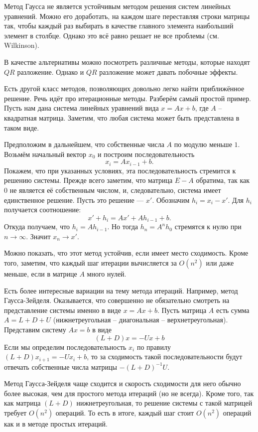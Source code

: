 Метод Гаусса не является устойчивым методом решения систем линейных уравнений. Можно его доработать, на каждом шаге переставляя строки матрицы так, чтобы каждый раз выбирать в качестве главного элемента  наибольший элемент в столбце. Однако это всё равно решает не все проблемы (см. Wilkinson).

В качестве альтернативы можно посмотреть различные методы, которые находят $QR$ разложение. Однако и $QR$ разложение может давать побочные эффекты.





Есть другой класс методов, позволяющих довольно легко найти приближённое решение. Речь идёт про  итерационные методы. Разберём самый простой пример. Пусть нам дана система линейных уравнений вида $x=Ax+b$, где $A$ -- квадратная матрица. Заметим, что любая система может быть представлена в таком виде. 

Предположим в дальнейшем, что собственные числа $A$ по модулю меньше $1$. Возьмём начальный вектор $x_0$ и построим последовательность
$$x_i=Ax_{i-1}+b.$$
Покажем, что при указанных условиях, эта последовательность стремится к решению системы. Прежде всего заметим, что матрица $E-A$ обратима, так как $0$ не является её собственным числом, и, следовательно, система имеет единственное решение. Пусть это решение --- $x'$. Обозначим $h_i=x_i-x'$. Для $h_i$ получается соотношение:
$$x'+h_i=Ax'+Ah_{i-1}+b.$$
Откуда получаем, что $h_i=Ah_{i-1}$. Но тогда $h_n=A^n h_0$ стремятся к нулю при $n\to \infty$. Значит $x_n\to x'$.


Можно показать, что этот метод устойчив, если имеет место сходимость. Кроме того, заметим, что каждый шаг итерации вычисляется за $O(n^2)$ или даже меньше, если в матрице $A$ много нулей.

Есть более интересные вариации на тему метода итераций. Например, метод Гаусса-Зейделя. Оказывается, что совершенно не обязательно смотреть на представление системы именно в виде $x=Ax+b$. Пусть матрица $A$ есть сумма $A=L+D+U$ (нижнетреугольная -- диагональная -- верхнетреугольная). Представим систему $Ax=b$ в виде 
$$(L+D)x=-Ux+b$$
Если мы определим последовательность $x_i$ по правилу $(L+D)x_{i+1}=-Ux_i+b$, то за сходимость такой последовательности будут отвечать собственные числа матрицы $-(L+D)^{-1}U$. 

Метод Гаусса-Зейделя чаще сходится и скорость сходимости для него обычно более высокая, чем для простого метода итераций (но не всегда). Кроме того, так как матрица $(L+D)$ нижнетреугольная, то решение системы с такой матрицей требует $O(n^2)$ операций. То есть в итоге, каждый шаг стоит $O(n^2)$ операций как и в методе простых итераций.







